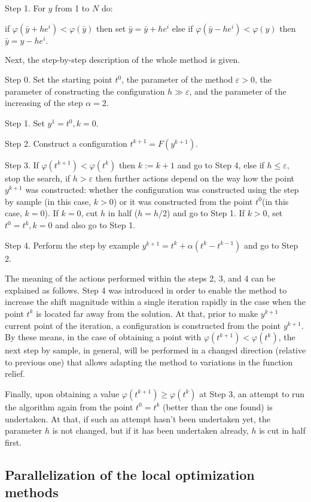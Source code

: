 \documentclass[runningheads]{llncs}
\begin{document}
Step 1. For $y$ from 1 to $N$ do:

if $\varphi(\bar{y} + he^i) < \varphi(\bar{y})$ then set $\bar{y} = \bar{y} + he^i$ else if $\varphi(\bar{y} - he^i) < \varphi(y)$ then $\bar{y} = y - he^i.$

Next, the step-by-step description of the whole method is given.

Step 0. Set the starting point $t^0$, the parameter of the method $\varepsilon > 0$, the parameter of constructing the configuration $h\gg\varepsilon$, and the parameter of the increasing of the step $\alpha=2$.

Step 1. Set $y^1  = t^0, k = 0$.

Step 2. Construct a configuration $t^{k+1} = F(y^{k +1})$.

Step 3. If $\varphi(t^{k+1}) < \varphi(t^{k})$ then $k:=k+1$ and go to Step 4, else if $h \leq \varepsilon$, stop the search, if $h > \varepsilon$ then further actions depend on the  way how the point $y^{k+1}$ was constructed: whether the configuration was constructed using the step by sample (in this case, $k > 0$) or it was constructed from the point $t^0$(in this case, $k=0$). If $k=0$, cut $h$ in half ($h=h/2$) and go to Step 1. If $k>0$, set $t^0 = t^k, k=0$ and also go to Step 1.

Step 4. Perform the step by example $y^{k+1} = t^k + \alpha (t^k - t^{k-1})$ and go to Step 2.

The meaning of the actions performed within the steps 2, 3, and 4 can be explained as follows. 
Step 4 was introduced in order to enable the method to increase the shift magnitude within a single iteration rapidly in the case when the point $t^k$ is located far away from the solution. At that, prior to make $y^{k+1}$ current point of the iteration, a configuration is constructed from the point $y^{k+1}$. By these means, in the case of obtaining a point with $\varphi(t^{k+1})< \varphi(t^k)$, the next step by sample, in general, will be performed in a changed direction (relative to previous one) that allows adapting the method to variations in the function relief.

Finally, upon obtaining a value $\varphi(t^{k+1}) \geq \varphi(t^k)$ at Step 3, an attempt to run the algorithm again from the point $t^0=t^k$ (better than the one found) is undertaken. At that, if such an attempt hasn’t been undertaken yet, the parameter $h$ is not changed, but if it has been undertaken already, $h$ is cut in half first.

\subsection{Parallelization of the local optimization methods}
\end{document}
